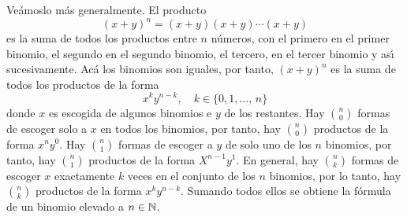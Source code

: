 Veámoslo más generalmente.
El producto
\[
	(x+y)^n = (x+y)(x+y)\cdots(x+y)
\]
es la suma de todos los productos entre $n$ n\'umeros, con el primero en el primer binomio, el segundo en el segundo binomio, el tercero, en el tercer binomio y as\'{\i} sucesivamente.
Ac\'a los binomios son iguales, por tanto,
$(x+y)^n$ es la suma de todos los productos de la forma 
\[
	x^ky^{n-k},\quad k \in \{0,1,\ldots,\,n\}
\]
donde $x$ es escogida de algunos binomios e $y$ de los restantes. 
Hay $\binom{n}{0}$ formas de escoger solo a $x$ en todos los binomios, por tanto, hay $\binom{n}{0}$ productos de la forma $x^ny^0$.
Hay $\binom{n}{1}$ formas de escoger a $y$ de solo uno de los $n$ binomios, por tanto, hay $\binom{n}{1}$ productos de la forma $X^{n-1}y^{1}$.
En general, hay $\binom{n}{k}$ formas de escoger $x$ exactamente $k$ veces en el conjunto de los $n$ binomios, por lo tanto, hay $\binom{n}{k}$ productos de la forma $x^ky^{n-k}$.
Sumando todos ellos se obtiene la f\'ormula de un binomio elevado a $n \in \mathbb{N}$.

